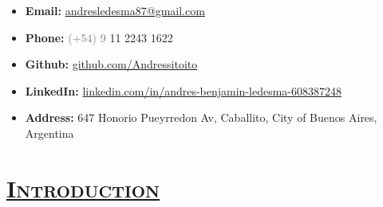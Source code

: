 \documentclass{resume} %
\begin{document}

\vspace{-1.0cm}
\begin{itemize}
  \setlength\itemsep{-7px}
  \item \textbf{Email:} \href{mailto:andresledesma87@gmail.com }{andresledesma87@gmail.com }
  \item \textbf{Phone:} \textcolor{gray}{(+54) 9} 11 2243 1622
  \item \textbf{Github:} \href{https://github.com/Andressitoito}{github.com/Andressitoito}
  \item \textbf{LinkedIn:} \href{https://www.linkedin.com/in/andres-benjamin-ledesma-608387248/}{linkedin.com/in/andres-benjamin-ledesma-608387248}
  \item \textbf{Address:} 647 Honorio Pueyrredon Av, Caballito, City of Buenos Aires, Argentina
\end{itemize}

\section*{\textsc{\underline{Introduction}}}
\end{document}
